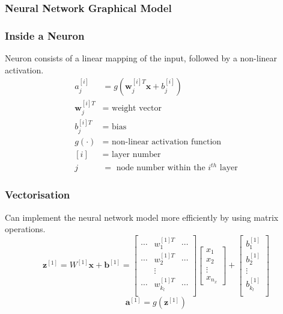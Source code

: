 \documentclass{beamer}
\newcommand{\mb}[1]{\mathbf{#1}}
\begin{document}
\begin{frame}
  \frametitle{Neural Network Graphical Model}
  
\end{frame}
% 
% 
% 
% 
\begin{frame}
  \frametitle{Inside a Neuron}
  Neuron consists of a linear mapping of the input, followed by a non-linear activation.
  \begin{align*}
    a^{[i]}_j &= g( \mb{w}^{[i]T}_j \mb{x} + b^{[i]}_j) 
    \\
    \mb{w}^{[i]T}_j &= \text{ weight vector}
    \\
    b^{[i]T}_j  &= \text{ bias}
    \\
    g( \cdot ) &= \text{ non-linear activation function}
    \\
    [i] &= \text{ layer number}
    \\
    j &= \text{ node number within the } i^{th} \text{ layer}
  \end{align*}
\end{frame}
% 
% 
% 
% 
\begin{frame}
  \frametitle{Vectorisation}
  Can implement the neural network model more efficiently by using matrix operations.
  \begin{equation*}
    \mathbf{z}^{[1]} = W^{[1]}\mathbf{x} + \mathbf{b}^{[1]} = 
    \begin{bmatrix}
      \cdots & w_{1}^{[1]T} & \cdots \\
      \cdots & w_{2}^{[1]T} & \cdots \\
      & \vdots       &  \\
      \cdots & w_{k_l}^{[1]T} & \cdots \\
    \end{bmatrix}
    \begin{bmatrix}
      x_1\\
      x_2\\
      \vdots\\
      x_{n_x}
    \end{bmatrix}
    + 
    \begin{bmatrix}
      b_{1}^{[1]} \\
      b_{2}^{[1]} \\
      \vdots \\
      b_{k_l}^{[1]} \\
    \end{bmatrix}
  \end{equation*}
  \vspace*{1cm}
  \begin{equation*}
    \mb{a}^{[1]} = g( \mb{z}^{[1]} )
  \end{equation*}
\end{frame}
\end{document}
